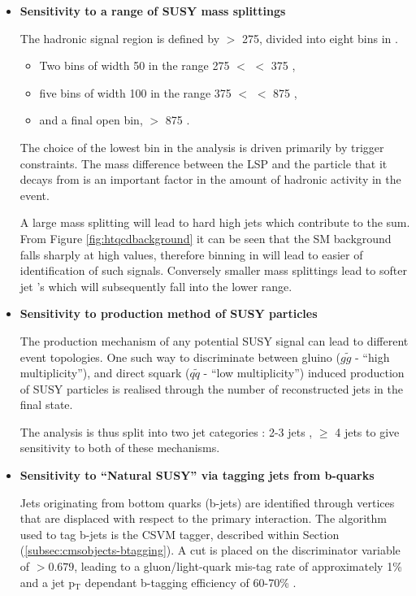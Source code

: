 \begin{itemize}

\item[] \textbf{Sensitivity to a range of \ac{SUSY} mass splittings}

The hadronic signal region is defined by \theht $>$ 275, divided into eight bins in \theht. 

\begin{itemize}
\item Two bins of width 50 \GeV in the range 275 $<$ \theht $<$ 375 \GeV,
\item five bins of width 100 \GeV in the range 375 $<$ \theht$<$ 875 \GeV,
\item and a final open bin, \theht $>$ 875 \GeV.
\end{itemize}

The choice of the lowest \theht bin in the analysis is driven primarily by trigger constraints. The mass difference between the \ac{LSP} and the particle that it decays from is an important factor in the amount of hadronic activity in the event. 

A large mass splitting will lead to hard high \pt jets which contribute to the \theht sum. From Figure \ref{fig:htqcdbackground} it can be seen that the \ac{SM} background falls sharply at high \theht values, therefore binning in \theht will lead to easier of identification of such signals. Conversely smaller mass splittings lead to softer jet \pt's which will subsequently fall into the lower \theht range.

\item[] \textbf{Sensitivity to production method of \ac{SUSY} particles}

The production mechanism of any potential \ac{SUSY} signal can lead to different event topologies. One such way to discriminate between gluino ($g\widetilde{g}$ - ``high multiplicity''), and direct squark ($q\widetilde{q}$ - ``low multiplicity'') induced production of \ac{SUSY} particles is realised through the number of reconstructed jets in the final state.  

The analysis is thus split into two jet categories : 2-3 jets , $\geq$ 4 jets to give sensitivity to both of these mechanisms. 

\item[] \textbf{Sensitivity to  ``Natural \ac{SUSY}'' via tagging jets from b-quarks}

Jets originating from bottom quarks (b-jets) are identified through vertices that are displaced with respect to the primary interaction. The algorithm used to tag b-jets is the \acf{CSVM} tagger, described within Section (\ref{subsec:cmsobjects-btagging}). A cut is placed on the discriminator variable of $> 0.679$, leading to a gluon/light-quark mis-tag rate of approximately 1\% and a jet p$_{\text{T}}$ dependant b-tagging efficiency of 60-70\% \cite{btag8tev}.


\end{itemize}

